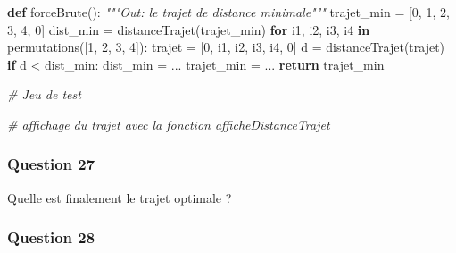 \documentclass[
  paper=a4,
  ,captions=tableheading
]{scrartcl}
\newenvironment{Shaded}{}{}
\newcommand{\CommentTok}[1]{\textcolor[rgb]{0.38,0.63,0.69}{\textit{#1}}}
\newcommand{\ControlFlowTok}[1]{\textcolor[rgb]{0.00,0.44,0.13}{\textbf{#1}}}
\newcommand{\DecValTok}[1]{\textcolor[rgb]{0.25,0.63,0.44}{#1}}
\newcommand{\KeywordTok}[1]{\textcolor[rgb]{0.00,0.44,0.13}{\textbf{#1}}}
\newcommand{\NormalTok}[1]{#1}
\newcommand{\OperatorTok}[1]{\textcolor[rgb]{0.40,0.40,0.40}{#1}}
\begin{document}
\begin{Shaded}
\begin{Highlighting}[]
\KeywordTok{def}\NormalTok{ forceBrute():}
    \CommentTok{"""Out: le trajet de distance minimale"""}
\NormalTok{    trajet\_min }\OperatorTok{=}\NormalTok{ [}\DecValTok{0}\NormalTok{, }\DecValTok{1}\NormalTok{, }\DecValTok{2}\NormalTok{, }\DecValTok{3}\NormalTok{, }\DecValTok{4}\NormalTok{, }\DecValTok{0}\NormalTok{]}
\NormalTok{    dist\_min }\OperatorTok{=}\NormalTok{ distanceTrajet(trajet\_min)}
    \ControlFlowTok{for}\NormalTok{ i1, i2, i3, i4 }\KeywordTok{in}\NormalTok{ permutations([}\DecValTok{1}\NormalTok{, }\DecValTok{2}\NormalTok{, }\DecValTok{3}\NormalTok{, }\DecValTok{4}\NormalTok{]):}
\NormalTok{        trajet }\OperatorTok{=}\NormalTok{ [}\DecValTok{0}\NormalTok{, i1, i2, i3, i4, }\DecValTok{0}\NormalTok{]}
\NormalTok{        d }\OperatorTok{=}\NormalTok{ distanceTrajet(trajet)}
        \ControlFlowTok{if}\NormalTok{ d }\OperatorTok{\textless{}}\NormalTok{ dist\_min:}
\NormalTok{            dist\_min }\OperatorTok{=}\NormalTok{ ...}
\NormalTok{            trajet\_min }\OperatorTok{=}\NormalTok{ ...}
    \ControlFlowTok{return}\NormalTok{ trajet\_min}
\end{Highlighting}
\end{Shaded}

\begin{Shaded}
\begin{Highlighting}[]
\CommentTok{\# Jeu de test}
\end{Highlighting}
\end{Shaded}

\begin{Shaded}
\begin{Highlighting}[]
\CommentTok{\# affichage du trajet avec la fonction afficheDistanceTrajet}
\end{Highlighting}
\end{Shaded}

\hypertarget{question-27}{%
\subsubsection{Question 27}\label{question-27}}

Quelle est finalement le trajet optimale ?

\hypertarget{question-28}{%
\subsubsection{Question 28}\label{question-28}}
\end{document}
